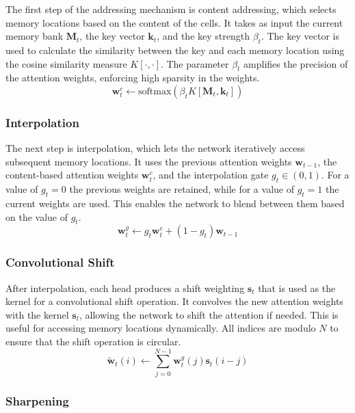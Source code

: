 \documentclass{article}
\begin{document}
The first step of the addressing mechanism is content addressing, which selects memory
locations based on the content of the cells. It takes as input the current memory bank
$\textbf{M}_t$, the key vector $\textbf{k}_t$, and the key strength $\beta_t$. The key
vector is used to calculate the similarity between the key and each memory location using
the cosine similarity measure $K[\cdot, \cdot]$. The parameter $\beta_t$ amplifies the
precision of the attention weights, enforcing high sparsity in the weights.
\begin{equation}
  \textbf{w}_t^c \leftarrow \text{softmax}(\beta_t K[\textbf{M}_t, \textbf{k}_t])
\end{equation}


\subsubsection{Interpolation}
\label{sec:4.1.1}

The next step is interpolation, which lets the network iteratively access subsequent
memory locations. It uses the previous attention weights $\textbf{w}_{t-1}$, the
content-based attention weights $\textbf{w}_t^c$, and the interpolation gate $g_t \in (0,
  1)$. For a value of $g_t = 0$ the previous weights are retained, while for a value of $g_t
  = 1$ the current weights are used. This enables the network to blend between them based on
the value of $g_t$.
\begin{equation}
  \textbf{w}_t^g \leftarrow g_t \textbf{w}_t^c + (1 - g_t) \textbf{w}_{t-1}
\end{equation}


\subsubsection{Convolutional Shift}
\label{sec:4.1.2}

After interpolation, each head produces a shift weighting $\textbf{s}_t$ that is used as
the kernel for a convolutional shift operation. It convolves the new attention weights
with the kernel $\textbf{s}_t$, allowing the network to shift the attention if needed.
This is useful for accessing memory locations dynamically. All indices are modulo
$N$ to ensure that the shift operation is circular.
\begin{equation}
  \tilde{\textbf{w}}_t(i) \leftarrow \sum_{j=0}^{N-1} \textbf{w}_t^g(j) \textbf{s}_t(i-j)
\end{equation}


\subsubsection{Sharpening}
\label{sec:4.1.3}
\end{document}

